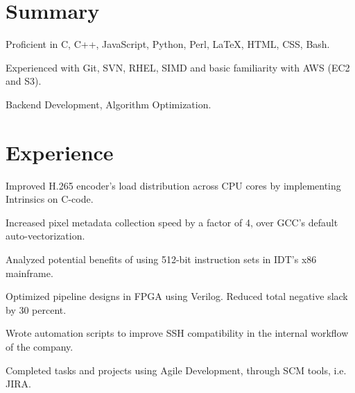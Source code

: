 \documentclass[]{deedy-resume-openfont}
\begin{document}
%
%


\section{Summary}
\descript{}
\sectionsep
\begin{tightemize}
\item Proficient in C, C++, JavaScript, Python, Perl, LaTeX, HTML, CSS, Bash.
\item Experienced with Git, SVN, RHEL, SIMD and basic familiarity with AWS (EC2 and S3). 
\end{tightemize}
\sectionsep

\sectionsep
\begin{tightemize}
\item Backend Development, Algorithm Optimization.
\end{tightemize}
\sectionsep
\section{Experience}
\begin{tightemize}
\item Improved H.265 encoder's load distribution across CPU cores by implementing Intrinsics on C-code.
\item Increased pixel metadata collection speed by a factor of 4, over GCC’s default auto-vectorization.
\item Analyzed potential beneﬁts of using 512-bit instruction sets in IDT’s x86 mainframe.
\item Optimized pipeline designs in FPGA using Verilog. Reduced total negative slack by 30 percent.
\item Wrote automation scripts to improve SSH compatibility in the internal workﬂow of the company.
\item Completed tasks and projects using Agile Development, through SCM tools, i.e. JIRA.
\end{tightemize}
\sectionsep
\end{document}
